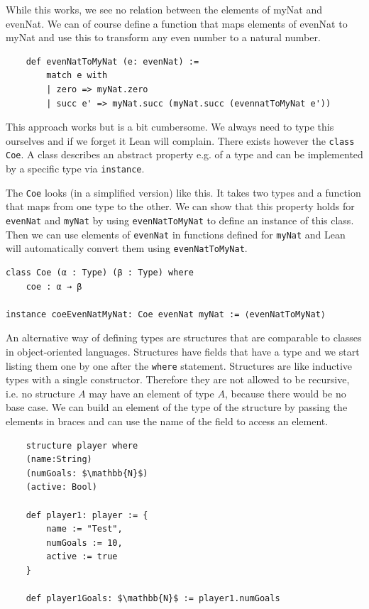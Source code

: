While this works, we see no relation between the elements of myNat and evenNat. We can of course define a function that maps elements of evenNat to myNat and use this to transform any even number to a natural number.

\begin{lstlisting}
    def evenNatToMyNat (e: evenNat) := 
        match e with
        | zero => myNat.zero
        | succ e' => myNat.succ (myNat.succ (evennatToMyNat e'))
\end{lstlisting}

This approach works but is a bit cumbersome. We always need to type this ourselves and if we forget it Lean will complain. There exists however the \lstinline|class Coe|. A class describes an abstract property e.g. of a type and can be implemented by a specific type via \lstinline|instance|.

The \lstinline|Coe| looks (in a simplified version) like this. It takes two types and a function that maps from one type to the other. We can show that this property holds for \lstinline|evenNat| and \lstinline|myNat| by using \lstinline|evenNatToMyNat| to define an instance of this class. Then we can use elements of \lstinline|evenNat| in functions defined for \lstinline|myNat| and Lean will automatically convert them using \lstinline|evenNatToMyNat|.

\begin{lstlisting}
class Coe (α : Type) (β : Type) where
    coe : α → β

instance coeEvenNatMyNat: Coe evenNat myNat := ⟨evenNatToMyNat⟩
\end{lstlisting}

An alternative way of defining types are structures that are comparable to classes in object-oriented languages. Structures have fields that have a type and we start listing them one by one after the \lstinline|where| statement. Structures are like inductive types with a single constructor. Therefore they are not allowed to be recursive, i.e. no structure $A$ may have an element of type $A$, because there would be no base case.
We can build an element of the type of the structure by passing the elements in braces and can use the name of the field to access an element.

\begin{lstlisting}
    structure player where
    (name:String)
    (numGoals: $\mathbb{N}$)
    (active: Bool)

    def player1: player := {
        name := "Test",
        numGoals := 10,
        active := true
    }

    def player1Goals: $\mathbb{N}$ := player1.numGoals
\end{lstlisting}

